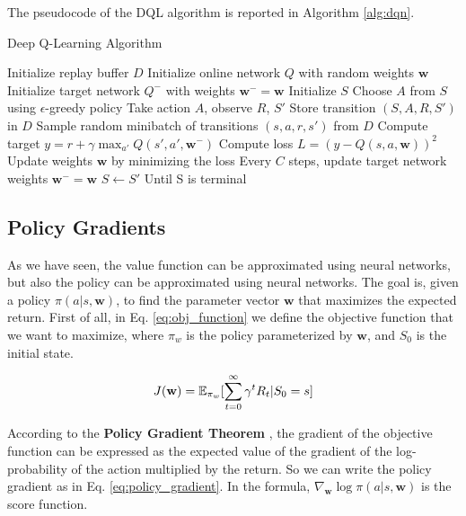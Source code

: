 The pseudocode of the DQL algorithm is reported in Algorithm \ref{alg:dqn}.

\begin{algorithm}
\caption{Deep Q-Learning Algorithm}\label{alg:dqn}
\begin{algorithmic}
\State Initialize replay buffer $D$
\State Initialize online network $Q$ with random weights $\textbf{w}$
\State Initialize target network $Q^-$ with weights $\textbf{w}^- = \textbf{w}$
    \State Initialize $S$
        \State Choose $A$ from $S$ using $\epsilon$-greedy policy
        \State Take action $A$, observe $R$, $S'$
        \State Store transition $(S, A, R, S')$ in $D$
        \State Sample random minibatch of transitions $(s, a, r, s')$ from $D$
        \State Compute target $y = r + \gamma \max_{a'} Q(s', a', \textbf{w}^-)$
        \State Compute loss $L = (y - Q(s, a, \textbf{w}))^2$
        \State Update weights $\textbf{w}$ by minimizing the loss
        \State Every $C$ steps, update target network weights $\textbf{w}^- = \textbf{w}$
        \State $S \leftarrow S'$
    \EndFor
\State Until S is terminal
\EndFor
\end{algorithmic}
\end{algorithm}





\subsection{Policy Gradients}\label{subsec:policy_gradients}
As we have seen, the value function can be approximated using neural networks, but also the policy can be approximated using neural networks.
The goal is, given a policy $\pi(a|s, \textbf{w})$, to find the parameter vector $\textbf{w}$ that maximizes the expected return.
First of all, in Eq. \ref{eq:obj_function} we define the objective function that we want to maximize, where $\pi_w$ is the policy parameterized by $\textbf{w}$, and $S_0$ is the initial state.

\begin{equation} \label{eq:obj_function}
    J(\textbf{w}) = \operatorname{\mathbb{E}}_{\pi_w}[\sum_{t=0}^{\infty} \gamma^t R_t | S_0 = s]
\end{equation}

According to the \textbf{Policy Gradient Theorem} \citep{sutton1999policy}, the gradient of the objective function can be expressed as the expected value of the gradient of the log-probability of the action multiplied by the return.
So we can write the policy gradient as in Eq. \ref{eq:policy_gradient}.
In the formula, $\nabla_{\textbf{w}} \log \pi(a|s, \textbf{w})$ is the score function.

